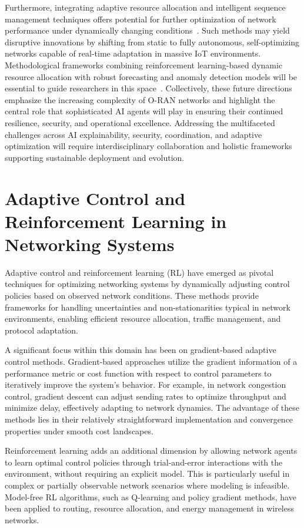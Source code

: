\documentclass[sigconf]{acmart}
\begin{document}
Furthermore, integrating adaptive resource allocation and intelligent sequence management techniques offers potential for further optimization of network performance under dynamically changing conditions~\cite{ref21}. Such methods may yield disruptive innovations by shifting from static to fully autonomous, self-optimizing networks capable of real-time adaptation in massive IoT environments. Methodological frameworks combining reinforcement learning-based dynamic resource allocation with robust forecasting and anomaly detection models will be essential to guide researchers in this space~\cite{ref50}. Collectively, these future directions emphasize the increasing complexity of O-RAN networks and highlight the central role that sophisticated AI agents will play in ensuring their continued resilience, security, and operational excellence. Addressing the multifaceted challenges across AI explainability, security, coordination, and adaptive optimization will require interdisciplinary collaboration and holistic frameworks supporting sustainable deployment and evolution.

\section{Adaptive Control and Reinforcement Learning in Networking Systems}

Adaptive control and reinforcement learning (RL) have emerged as pivotal techniques for optimizing networking systems by dynamically adjusting control policies based on observed network conditions. These methods provide frameworks for handling uncertainties and non-stationarities typical in network environments, enabling efficient resource allocation, traffic management, and protocol adaptation.

A significant focus within this domain has been on gradient-based adaptive control methods. Gradient-based approaches utilize the gradient information of a performance metric or cost function with respect to control parameters to iteratively improve the system's behavior. For example, in network congestion control, gradient descent can adjust sending rates to optimize throughput and minimize delay, effectively adapting to network dynamics. The advantage of these methods lies in their relatively straightforward implementation and convergence properties under smooth cost landscapes.

Reinforcement learning adds an additional dimension by allowing network agents to learn optimal control policies through trial-and-error interactions with the environment, without requiring an explicit model. This is particularly useful in complex or partially observable network scenarios where modeling is infeasible. Model-free RL algorithms, such as Q-learning and policy gradient methods, have been applied to routing, resource allocation, and energy management in wireless networks.
\end{document}
